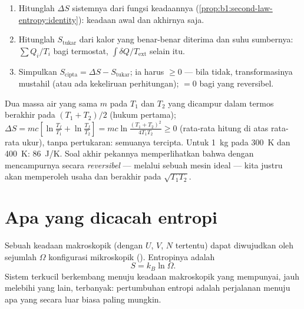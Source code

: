 \begin{method}\label{met:b1:second-law-entropy:method}
\begin{enumerate}
  \item Hitunglah $\Delta S$ sistemnya dari fungsi keadaannya
        (\cref{prop:b1:second-law-entropy:identity}): keadaan awal dan
        akhirnya saja.
  \item Hitunglah $S_{\mathrm{tukar}}$ dari kalor yang benar-benar diterima dan
        suhu sumbernya: $\sum Q_i/T_i$ bagi termostat,
        $\int\delta Q/T_{\mathrm{ext}}$ selain itu.
  \item Simpulkan $S_{\mathrm{cipta}} = \Delta S - S_{\mathrm{tukar}}$; ia harus
        $\geq 0$ --- bila tidak, transformasinya mustahil (atau ada kekeliruan
        perhitungan); $= 0$ bagi yang reversibel.
\end{enumerate}
\end{method}

\begin{example}\label{ex:b1:second-law-entropy:mixing}
Dua massa air yang sama $m$ pada $T_1$ dan $T_2$ yang dicampur dalam termos berakhir pada
$(T_1 + T_2)/2$ (hukum pertama); $\Delta S = mc[\ln\frac{T_f}{T_1} + \ln\frac{T_f}{T_2}]
= mc\ln\frac{(T_1 + T_2)^2}{4T_1T_2} \geq 0$ (rata-rata hitung di atas rata-rata
ukur), tanpa pertukaran: semuanya tercipta. Untuk \qty{1}{kg} pada \qty{300}{K} dan
\qty{400}{K}: \qty{86}{J/K}. Soal akhir pekannya memperlihatkan bahwa dengan mencampurnya
secara \emph{reversibel} --- melalui sebuah mesin ideal --- kita justru akan
memperoleh usaha dan berakhir pada $\sqrt{T_1T_2}$.
\end{example}

\section{Apa yang dicacah entropi}

\begin{proposition}\label{prop:b1:second-law-entropy:boltzmann}
Sebuah keadaan makroskopik (dengan $U$, $V$, $N$ tertentu) dapat diwujudkan oleh sejumlah
$\Omega$ konfigurasi mikroskopik (\emph{}). Entropinya adalah
\[
S = k_B\ln\Omega .
\]
Sistem terkucil berkembang menuju keadaan makroskopik yang mempunyai, jauh
melebihi yang lain,  terbanyak: pertumbuhan entropi adalah perjalanan menuju
apa yang secara luar biasa paling mungkin.
\end{proposition}
\admitted

